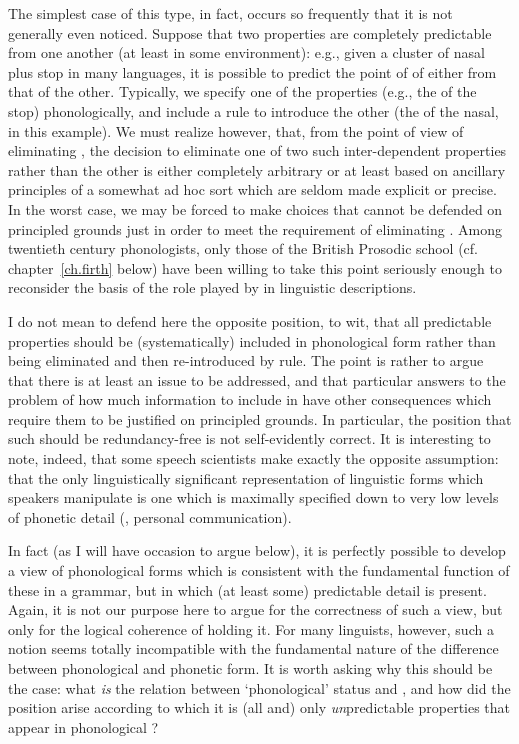 The simplest case of this type, in fact, occurs so frequently that it
is not generally even noticed.  Suppose that two properties are
completely predictable from one another (at least in some
environment): e.g., given a cluster of nasal plus stop in many
languages, it is possible to predict the point of  of
either from that of the other.  Typically, we specify one of the
properties (e.g., the  of the stop) phonologically, and
include a rule to introduce the other (the  of the nasal,
in this example).  We must realize however, that, from the point of
view of eliminating , the decision to eliminate one of two
such inter-dependent properties rather than the other is either
completely arbitrary or at least based on ancillary principles of a
somewhat ad hoc sort which are seldom made explicit or precise.  In
the worst case, we may be forced to make choices that cannot be
defended on principled grounds just in order to meet the requirement
of eliminating .  Among twentieth century phonologists, only
those of the British Prosodic school (cf.  chapter~\ref{ch.firth} below) have
been willing to take this point seriously enough to reconsider the
basis of the role played by  in linguistic descriptions.

I do not mean to defend here the opposite position, to wit, that all
predictable properties should be (systematically) included in
phonological form rather than being eliminated and then re-introduced
by rule. The point is rather to argue that there is at least an issue
to be addressed, and that particular answers to the problem of how
much information to include in  have other
consequences which require them to be justified on principled
grounds. In particular, the position that such  should
be redundancy-free is not self-evidently correct. It is interesting to
note, indeed, that some speech scientists make exactly the opposite
assumption: that the only linguistically significant representation of
linguistic forms which speakers manipulate is one which is maximally
specified down to very low {levels} of phonetic detail (,
personal communication).

In fact (as I will have occasion to argue below), it is perfectly
possible to develop a view of phonological forms which is consistent
with the fundamental function of these  in a grammar,
but in which (at least some) predictable detail is present. Again, it
is not our purpose here to argue for the correctness of such a view,
but only for the logical coherence of holding it.  For many linguists,
however, such a notion seems totally incompatible with the fundamental
nature of the difference between phonological and phonetic form.  It
is worth asking why this should be the case: what \emph{is} the relation
between `phonological' status and , and how did the
position arise according to which it is (all and) only
\emph{un}predictable properties that appear in phonological
?

